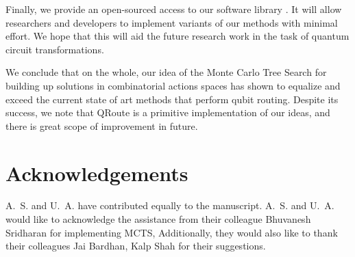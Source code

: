 \documentclass[%
 reprint,
 longbibliography,
 amsmath,amssymb,
 aps,
]{revtex4-2}
\begin{document}
Finally, we provide an open-sourced access to our software library \citep{codebase}. It will allow researchers and developers to implement variants of our methods with minimal effort. We hope that this will aid the future research work in the task of quantum circuit transformations.

We conclude that on the whole, our idea of the Monte Carlo Tree Search for building up solutions in combinatorial actions spaces has shown to equalize and exceed the current state of art methods that perform qubit routing. Despite its success, we note that QRoute is a primitive implementation of our ideas, and there is great scope of improvement in future. 

\section*{Acknowledgements}
A.~S. and U.~A. have contributed equally to the manuscript. A.~S. and U.~A. would like to acknowledge the assistance from their colleague Bhuvanesh Sridharan for implementing MCTS, Additionally, they would also like to thank their colleagues Jai Bardhan, Kalp Shah for their suggestions.


\end{document}
